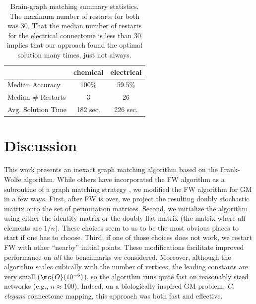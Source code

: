 \documentclass[10pt,journal,cspaper,compsoc]{IEEEtran}
\begin{document}
\begin{table}
	  \caption{Brain-graph matching summary statistics.  The maximum number of restarts for both was 30.  That the median number of restarts for the electrical connectome is less than 30 implies that our approach found the optimal solution many times, just not always.}
	\label{tab:1}\centering
\begin{tabular}{|l|c|c|}
\hline	 					& chemical 		& electrical  \\ \hline
	Median Accuracy    &       100\%            &             59.5\% \\
	Median \# Restarts  &         3            &                   26 \\
	Avg. Solution Time     &      182 sec.      &                226 sec. \\ \hline
\end{tabular} 
\end{table}

 





\section{Discussion}

This work presents an inexact graph matching algorithm based on the Frank-Wolfe algorithm.  While others have incorporated the FW algorithm as a subroutine of a graph matching strategy \cite{Zaslavskiy2009}, we modified the FW algorithm for GM in a few ways.  First, after FW is over, we project the resulting doubly stochastic matrix onto the set of permutation matrices.  Second, we initialize the algorithm using either the identity matrix or the doubly flat matrix (the matrix where all elements are $1/n$).  These choices seem to us to be the most obvious places to start if one has to choose.  Third, if one of those choices does not work, we restart FW with other ``nearby'' initial points.  These modifications facilitate improved performance on \emph{all} the benchmarks we considered.  Moreover, although the algorithm scales cubically with the number of vertices, the leading constants are very small ($\mc{O}(10^{-6})$), so the algorithm runs quite fast on reasonably sized networks (e.g., $n \approx 100$).  Indeed, on a biologically inspired GM problem, \emph{C. elegans} connectome mapping, this approach was both fast and effective.  
\end{document}
